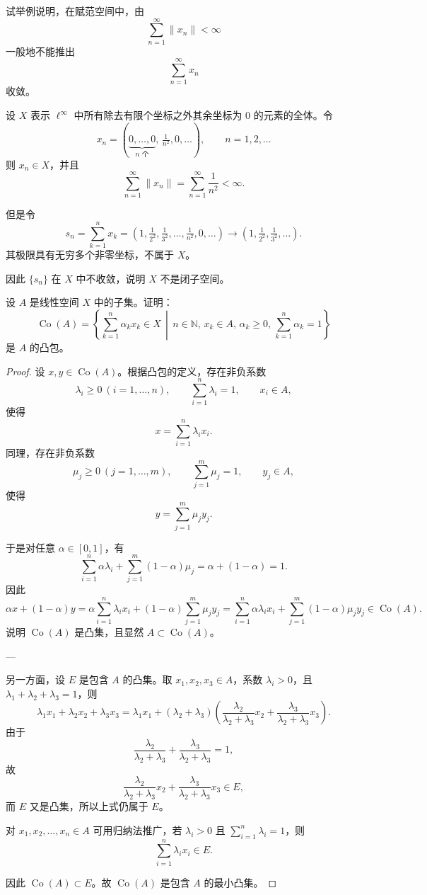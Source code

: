 \begin{homework}[4]
试举例说明，在赋范空间中，由
\[
\sum_{n=1}^{\infty} \|x_n\| < \infty
\]
一般地不能推出
\[
\sum_{n=1}^{\infty} x_n
\]
收敛。
\end{homework}
\begin{solution}
设 $X$ 表示 $\ell^\infty$ 中所有除去有限个坐标之外其余坐标为 $0$ 的元素的全体。令
\[
x_n=(\underbrace{0,\ldots,0}_{n\text{ 个}},\,\tfrac{1}{n^2},0,\ldots),\qquad n=1,2,\ldots
\]
则 $x_n\in X$，并且
\[
\sum_{n=1}^\infty \|x_n\|=\sum_{n=1}^\infty \frac{1}{n^2}<\infty.
\]

但是令
\[
s_n=\sum_{k=1}^n x_k
    =(1,\tfrac{1}{2^2},\tfrac{1}{3^2},\ldots,\tfrac{1}{n^2},0,\ldots)
    \longrightarrow (1,\tfrac{1}{2^2},\tfrac{1}{3^2},\ldots).
\]
其极限具有无穷多个非零坐标，不属于 $X$。

因此 $\{s_n\}$ 在 $X$ 中不收敛，说明 $X$ 不是闭子空间。
\end{solution}
\begin{homework}[11]
设 $A$ 是线性空间 $X$ 中的子集。证明：
\[
\operatorname{Co}(A) = \left\{ \sum_{k=1}^n \alpha_k x_k \in X \,\middle|\, n \in \mathbb{N},\, x_k \in A,\, \alpha_k \ge 0,\, \sum_{k=1}^n \alpha_k = 1 \right\}
\]
是 $A$ 的凸包。
\end{homework}
\begin{proof}
设 $x,y\in \operatorname{Co}(A)$。根据凸包的定义，存在非负系数
\[
\lambda_i\ge 0 \ (i=1,\dots,n),\qquad \sum_{i=1}^n \lambda_i=1,\qquad x_i\in A,
\]
使得
\[
x=\sum_{i=1}^n \lambda_i x_i.
\]
同理，存在非负系数
\[
\mu_j\ge 0 \ (j=1,\dots,m),\qquad \sum_{j=1}^m \mu_j=1,\qquad y_j\in A,
\]
使得
\[
y=\sum_{j=1}^m \mu_j y_j.
\]

于是对任意 $\alpha\in[0,1]$，有
\[
\sum_{i=1}^n \alpha\lambda_i+\sum_{j=1}^m (1-\alpha)\mu_j
=\alpha+(1-\alpha)=1.
\]
因此
\[
\alpha x+(1-\alpha)y
=\alpha\sum_{i=1}^n \lambda_i x_i +(1-\alpha)\sum_{j=1}^m \mu_j y_j
=\sum_{i=1}^n \alpha\lambda_i x_i + \sum_{j=1}^m (1-\alpha)\mu_j y_j\in \operatorname{Co}(A).
\]
说明 $\operatorname{Co}(A)$ 是凸集，且显然 $A\subset \operatorname{Co}(A)$。

---

另一方面，设 $E$ 是包含 $A$ 的凸集。取 $x_1,x_2,x_3\in A$，系数 $\lambda_i>0$，且 $\lambda_1+\lambda_2+\lambda_3=1$，则
\[
\lambda_1 x_1+\lambda_2 x_2+\lambda_3 x_3
= \lambda_1 x_1 + (\lambda_2+\lambda_3)
\left( \frac{\lambda_2}{\lambda_2+\lambda_3}x_2+\frac{\lambda_3}{\lambda_2+\lambda_3}x_3\right).
\]
由于
\[
\frac{\lambda_2}{\lambda_2+\lambda_3} + \frac{\lambda_3}{\lambda_2+\lambda_3}=1,
\]
故
\[
\frac{\lambda_2}{\lambda_2+\lambda_3} x_2+\frac{\lambda_3}{\lambda_2+\lambda_3} x_3\in E,
\]
而 $E$ 又是凸集，所以上式仍属于 $E$。  

对 $x_1,x_2,\dots,x_n\in A$ 可用归纳法推广，若 $\lambda_i>0$ 且 $\sum_{i=1}^n\lambda_i=1$，则
\[
\sum_{i=1}^n \lambda_i x_i\in E.
\]

因此 $\operatorname{Co}(A)\subset E$。故 $\operatorname{Co}(A)$ 是包含 $A$ 的最小凸集。
\end{proof}
